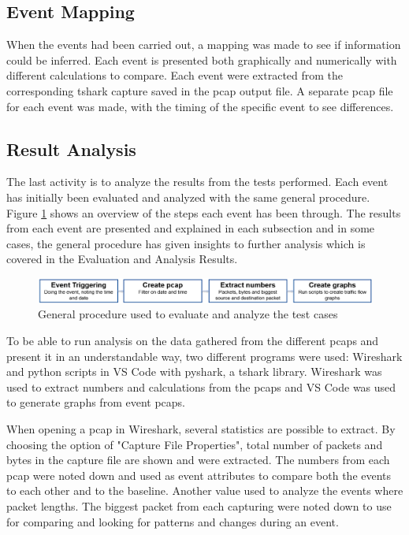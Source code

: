 \subsection{Event Mapping}
When the events had been carried out, a mapping was made to see if information could be inferred. Each event is presented both graphically and numerically with different calculations to compare. Each event were extracted from the corresponding tshark capture saved in the pcap output file. A separate pcap file for each event was made, with the timing of the specific event to see differences. 

\subsection{Result Analysis}
The last activity is to analyze the results from the tests performed. Each event has initially been evaluated and analyzed with the same general procedure. Figure \ref{fig:GeneralProcedure} shows an overview of the steps each event has been through. The results from each event are presented and explained in each subsection and in some cases, the general procedure has given insights to further analysis which is covered in the Evaluation and Analysis Results.

\begin{figure}[H]
    \centering
    \includegraphics[width=\textwidth]{figures/GeneralProcedure.png}
    \caption{General procedure used to evaluate and analyze the test cases}
    \label{fig:GeneralProcedure}
\end{figure}

To be able to run analysis on the data gathered from the different \gls{pcaps} and present it in an understandable way, two different programs were used: Wireshark and python scripts in \gls{VS Code} with pyshark, a tshark library. Wireshark was used to extract numbers and calculations from the pcaps and \gls{VS Code} was used to generate graphs from event \gls{pcaps}.

When opening a pcap in Wireshark, several statistics are possible to extract. By choosing the option of "Capture File Properties", total number of packets and bytes in the capture file are shown and were extracted. The numbers from each pcap were noted down and used as event attributes to compare both the events to each other and to the baseline. Another value used to analyze the events where packet lengths. The biggest packet from each capturing were noted down to use for comparing and looking for patterns and changes during an event. 

